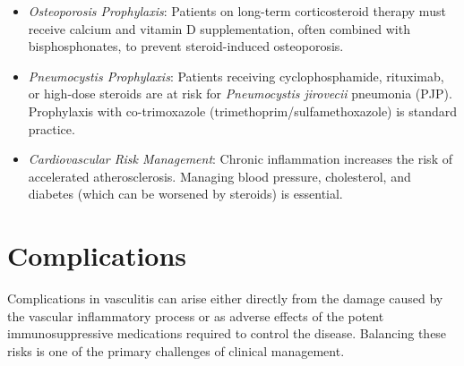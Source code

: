 \begin{itemize}
  \begin{itemize}
  \item \textit{Osteoporosis Prophylaxis}: Patients on long-term corticosteroid therapy must receive calcium and vitamin D supplementation, often combined with bisphosphonates, to prevent steroid-induced osteoporosis.
  \item \textit{Pneumocystis Prophylaxis}: Patients receiving cyclophosphamide, rituximab, or high-dose steroids are at risk for \textit{Pneumocystis jirovecii} pneumonia (PJP). Prophylaxis with co-trimoxazole (trimethoprim/sulfamethoxazole) is standard practice.
  \item \textit{Cardiovascular Risk Management}: Chronic inflammation increases the risk of accelerated atherosclerosis. Managing blood pressure, cholesterol, and diabetes (which can be worsened by steroids) is essential.
  \end{itemize}
\end{itemize}

\section*{Complications}
Complications in vasculitis can arise either directly from the damage caused by the vascular inflammatory process or as adverse effects of the potent immunosuppressive medications required to control the disease. Balancing these risks is one of the primary challenges of clinical management.

